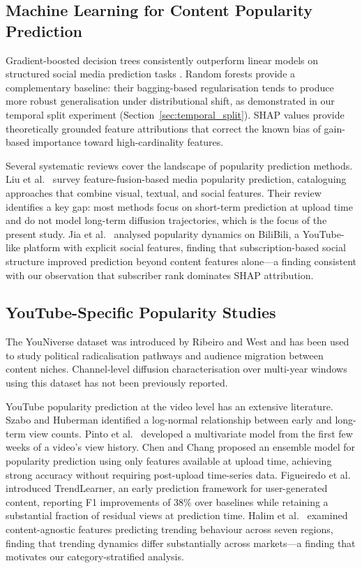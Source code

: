 \documentclass[journal,article,submit,pdftex,moreauthors]{Definitions/mdpi}
\begin{document}
\subsection{Machine Learning for Content Popularity Prediction}

Gradient-boosted decision trees consistently outperform linear models on
structured social media prediction tasks \cite{ref-chen2016,ref-ke2017}.
Random forests \cite{ref-breiman2001} provide a complementary baseline:
their bagging-based regularisation tends to produce more robust generalisation
under distributional shift, as demonstrated in our temporal split experiment
(Section~\ref{sec:temporal_split}).
SHAP values \cite{ref-lundberg2017,ref-lundberg2019} provide theoretically
grounded feature attributions that correct the known bias of gain-based
importance toward high-cardinality features.

Several systematic reviews cover the landscape of popularity prediction
methods.
Liu et al.\ \cite{ref-liu2022} survey feature-fusion-based media
popularity prediction, cataloguing approaches that combine visual,
textual, and social features.
Their review identifies a key gap: most methods focus on short-term
prediction at upload time and do not model long-term diffusion trajectories,
which is the focus of the present study.
Jia et al.\ \cite{ref-jia2018} analysed popularity dynamics on BiliBili,
a YouTube-like platform with explicit social features, finding that
subscription-based social structure improved prediction beyond content
features alone---a finding consistent with our observation that subscriber
rank dominates SHAP attribution.

\subsection{YouTube-Specific Popularity Studies}

The YouNiverse dataset was introduced by Ribeiro and West
\cite{ref-ribeiro2021} and has been used to study political
radicalisation pathways \cite{ref-ribeiro2020} and audience migration
between content niches.
Channel-level diffusion characterisation over multi-year windows using
this dataset has not been previously reported.

YouTube popularity prediction at the video level has an extensive literature.
Szabo and Huberman \cite{ref-szabo2010} identified a log-normal relationship
between early and long-term view counts.
Pinto et al.\ \cite{ref-pinto2013} developed a multivariate model from
the first few weeks of a video's view history.
Chen and Chang \cite{ref-chen2019} proposed an ensemble model for
popularity prediction using only features available at upload time,
achieving strong accuracy without requiring post-upload time-series data.
Figueiredo et al.\ \cite{ref-figueiredo2016} introduced TrendLearner,
an early prediction framework for user-generated content, reporting
F1 improvements of 38\% over baselines while retaining a substantial
fraction of residual views at prediction time.
Halim et al.\ \cite{ref-halim2022} examined content-agnostic features
predicting trending behaviour across seven regions, finding that trending
dynamics differ substantially across markets---a finding that motivates our
category-stratified analysis.
\end{document}
